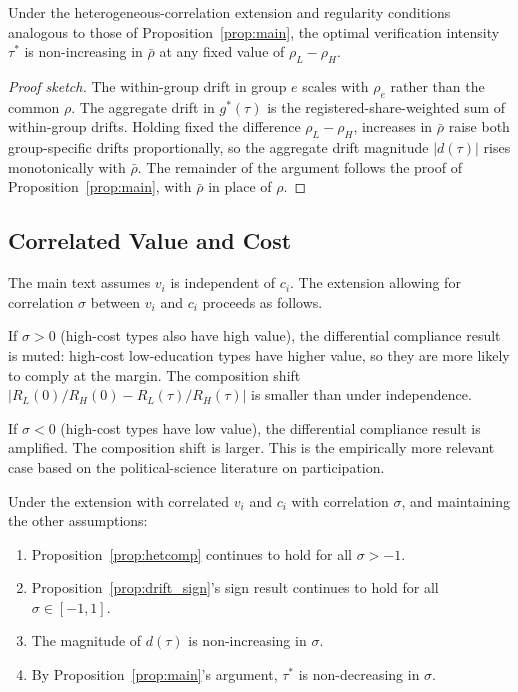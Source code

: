 \begin{proposition}
\label{prop:hetero_rho}
Under the heterogeneous-correlation extension and regularity conditions analogous to those of Proposition~\ref{prop:main}, the optimal verification intensity $\tau^*$ is non-increasing in $\bar\rho$ at any fixed value of $\rho_L - \rho_H$.
\end{proposition}

\begin{proof}[Proof sketch]
The within-group drift in group $e$ scales with $\rho_e$ rather than the common $\rho$. The aggregate drift in $g^*(\tau)$ is the registered-share-weighted sum of within-group drifts. Holding fixed the difference $\rho_L - \rho_H$, increases in $\bar\rho$ raise both group-specific drifts proportionally, so the aggregate drift magnitude $|d(\tau)|$ rises monotonically with $\bar\rho$. The remainder of the argument follows the proof of Proposition~\ref{prop:main}, with $\bar\rho$ in place of $\rho$.
\end{proof}

\subsection{Correlated Value and Cost}
\label{ssec:vcost}

The main text assumes $v_i$ is independent of $c_i$. The extension allowing for correlation $\sigma$ between $v_i$ and $c_i$ proceeds as follows.

If $\sigma > 0$ (high-cost types also have high value), the differential compliance result is muted: high-cost low-education types have higher value, so they are more likely to comply at the margin. The composition shift $|R_L(0)/R_H(0) - R_L(\tau)/R_H(\tau)|$ is smaller than under independence.

If $\sigma < 0$ (high-cost types have low value), the differential compliance result is amplified. The composition shift is larger. This is the empirically more relevant case based on the political-science literature on participation.

\begin{proposition}
\label{prop:vc_corr}
Under the extension with correlated $v_i$ and $c_i$ with correlation $\sigma$, and maintaining the other assumptions:
\begin{enumerate}
    \item[(i)] Proposition~\ref{prop:hetcomp} continues to hold for all $\sigma > -1$.
    \item[(ii)] Proposition~\ref{prop:drift_sign}'s sign result continues to hold for all $\sigma \in [-1, 1]$.
    \item[(iii)] The magnitude of $d(\tau)$ is non-increasing in $\sigma$.
    \item[(iv)] By Proposition~\ref{prop:main}'s argument, $\tau^*$ is non-decreasing in $\sigma$.
\end{enumerate}
\end{proposition}

